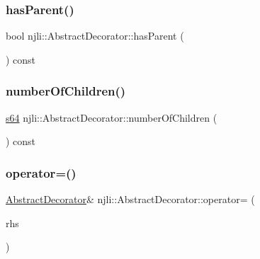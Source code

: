 \subsubsection{\texorpdfstring{has\+Parent()}{hasParent()}}
{\footnotesize\ttfamily bool njli\+::\+Abstract\+Decorator\+::has\+Parent (\begin{DoxyParamCaption}{ }\end{DoxyParamCaption}) const\hspace{0.3cm}{\ttfamily [protected]}}

\mbox{\label{classnjli_1_1_abstract_decorator_a7c725af71849474d7a5e05ae79b38661}} 
\subsubsection{\texorpdfstring{number\+Of\+Children()}{numberOfChildren()}}
{\footnotesize\ttfamily \mbox{\hyperlink{_util_8h_a4258bfb2c3a440d06c4aaa3c2b450dde}{s64}} njli\+::\+Abstract\+Decorator\+::number\+Of\+Children (\begin{DoxyParamCaption}{ }\end{DoxyParamCaption}) const\hspace{0.3cm}{\ttfamily [protected]}}

\mbox{\label{classnjli_1_1_abstract_decorator_a5d151ef3bd5e6d015fc2c99a35fcb188}} 
\subsubsection{\texorpdfstring{operator=()}{operator=()}}
{\footnotesize\ttfamily \mbox{\hyperlink{classnjli_1_1_abstract_decorator}{Abstract\+Decorator}}\& njli\+::\+Abstract\+Decorator\+::operator= (\begin{DoxyParamCaption}\item[{const \mbox{\hyperlink{classnjli_1_1_abstract_decorator}{Abstract\+Decorator}} \&}]{rhs }\end{DoxyParamCaption})\hspace{0.3cm}{\ttfamily [private]}}

